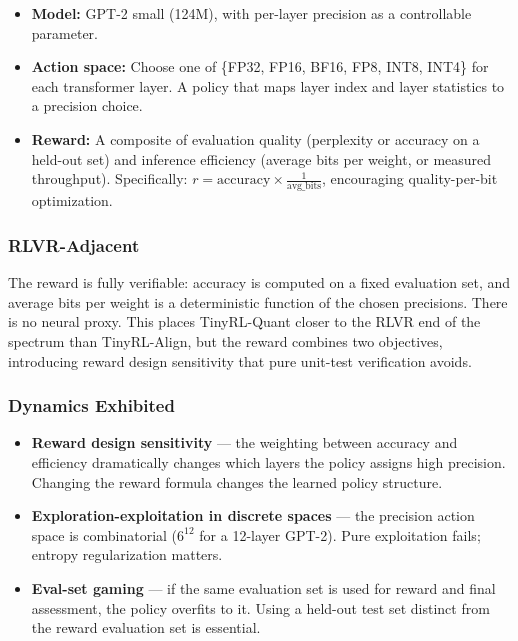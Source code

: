 \begin{itemize}
  \item \textbf{Model:} GPT-2 small (124M), with per-layer precision as a controllable parameter.
  \item \textbf{Action space:} Choose one of \{FP32, FP16, BF16, FP8, INT8, INT4\} for each transformer layer. A policy that maps layer index and layer statistics to a precision choice.
  \item \textbf{Reward:} A composite of evaluation quality (perplexity or accuracy on a held-out set) and inference efficiency (average bits per weight, or measured throughput). Specifically: $r = \text{accuracy} \times \frac{1}{\text{avg\_bits}}$, encouraging quality-per-bit optimization.
\end{itemize}

\subsubsection*{RLVR-Adjacent}

The reward is fully verifiable: accuracy is computed on a fixed evaluation set, and average bits per weight is a deterministic function of the chosen precisions. There is no neural proxy. This places TinyRL-Quant closer to the RLVR end of the spectrum than TinyRL-Align, but the reward combines two objectives, introducing reward design sensitivity that pure unit-test verification avoids.

\subsubsection*{Dynamics Exhibited}

\begin{itemize}
  \item \textbf{Reward design sensitivity} --- the weighting between accuracy and efficiency dramatically changes which layers the policy assigns high precision. Changing the reward formula changes the learned policy structure.
  \item \textbf{Exploration-exploitation in discrete spaces} --- the precision action space is combinatorial ($6^{12}$ for a 12-layer GPT-2). Pure exploitation fails; entropy regularization matters.
  \item \textbf{Eval-set gaming} --- if the same evaluation set is used for reward and final assessment, the policy overfits to it. Using a held-out test set distinct from the reward evaluation set is essential.
\end{itemize}

